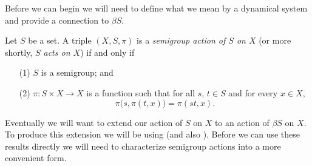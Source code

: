 Before we can begin we will need to define what we mean by a dynamical
system and provide a connection to $\beta S$.
  \begin{defn}
    \label{defn:semiact}
    Let $S$ be a set. 
    A triple $(X, S, \pi)$ is a \textsl{semigroup action of $S$ on
      $X$} (or more shortly, \textsl{$S$ acts on $X$}) if and only if 
      \begin{itemize}
        \item[(1)] $S$ is a semigroup; and
        
        \item[(2)] $\pi : S \times X \to X$ is a function%
 such that
          for all $s$, $t \in S$ and for every $x \in X$,
          \[ \pi\bigl(s, \pi(t,x)\bigr) = \pi(st, x). \]
          
      \end{itemize}
  \end{defn}
  

Eventually we will want to extend our action of $S$ on $X$ to an
action of $\beta S$ on $X$.
To produce this extension we will be using \cite[Lemma
3.30]{Hindman:1998fk} (and also \cite[Corollary
4.22]{Hindman:1998fk}). 
Before we can use these results directly we will need to characterize
semigroup actions into a more convenient form. 

